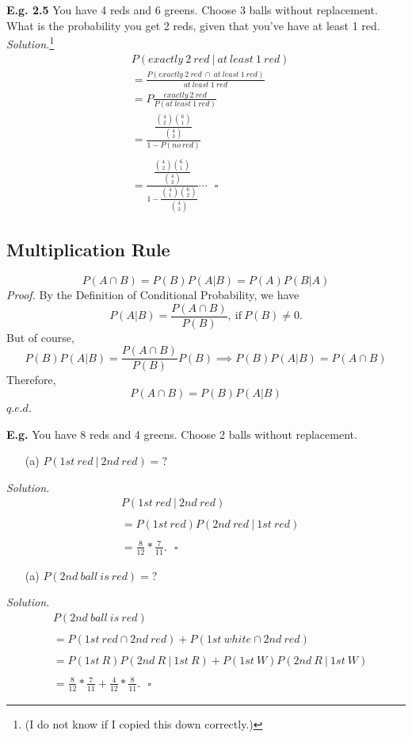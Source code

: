\documentclass[12pt]{book}
\begin{document}
\noindent \textbf{E.g. 2.5} You have 4 reds and 6 greens. Choose 3 balls without replacement. What is the probability you get 2 reds, given that you've have at least 1 red. \\
\textit{Solution.}\footnote{(I do not know if I copied this down correctly.)}
\begin{align*}
& P(exactly~2~red~|~at~least~1~red)\\
&= \frac{P(exactly~2~red~\cap~at~least~1~red)}{at~least~1~red}\\
&= P\frac{exactly~2~red}{P(at~least~1~red)}\\
&= \frac{\dfrac{{4\choose 2}{6\choose1}}{{4\choose3}}}{1-P(no~red)}\\\\
&= \frac{\dfrac{{4\choose 2}{6\choose1}}{{4\choose3}}}{1-\dfrac{{4\choose 1}{6\choose2}}{{4\choose3}}}\cdots~~~\square
\end{align*}


\subsection{Multiplication Rule}
$$\boxed{P(A\cap B)=P(B)P(A|B)=P(A)P(B|A)}$$
\textit{Proof.} By the Definition of Conditional Probability, we have
$$P(A|B)=\frac{P(A\cap B)}{P(B)},~\text{if}~P(B)\neq0.$$ 
But of course,
$$P(B)P(A|B)=\frac{P(A\cap B)}{P(B)}P(B)\implies{}P(B)P(A|B)=P(A\cap B)$$
Therefore, $$P(A\cap B)=P(B)P(A|B)$$\hfill$q.e.d.$

\noindent \textbf{E.g.} You have 8 reds and 4 greens. Choose 2 balls without replacement. 
\begin{itemize}\item [(a)] $P(1st~red~|~2nd~red)=?$ \end{itemize}
\textit{Solution.}
\begin{align*}
& P(1st~red~|~2nd~red)\\\\
&= P(1st~red)P(2nd~red~|~1st~red)\\\\
&= \frac{8}{12} * \frac{7}{11}.~~~\square
\end{align*}

\begin{itemize}\item [(a)] $P(2nd~ball~is~red)=?$ \end{itemize}
\textit{Solution.}
\begin{align*}
& P(2nd~ball~is~red)\\\\
&= P(1st~red\cap 2nd~red)+P(1st~white\cap 2nd~red)\\\\
&= P(1st~R)P(2nd~R~|~1st~R)+P(1st~W)P(2nd~R~|~1st~W)\\\\
&= \frac{8}{12}* \frac{7}{11} + \frac{4}{12} * \frac{8}{11}.~~~\square
\end{align*}
\end{document}
